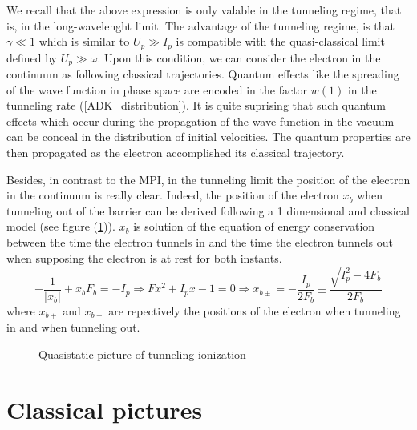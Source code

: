\documentclass[a4paper]{article}
\begin{document}
\par
We recall that the above expression is only valable in the tunneling regime, that is, in the long-wavelenght limit. The advantage of the tunneling regime, is that $\gamma \ll 1$ which is similar to $U_{p} \gg I_{p}$ is compatible with the quasi-classical limit defined by $U_{p} \gg \omega$. Upon this condition, we can consider the electron in the continuum as following classical trajectories. Quantum effects like the spreading of the wave function in phase space are encoded in the factor $w(1)$ in the tunneling rate (\ref{ADK_distribution}). It is quite suprising that such quantum effects which occur during the propagation of the wave function in the vacuum can be conceal in the distribution of initial velocities. The quantum properties are then propagated as the electron accomplished its classical trajectory. 
\par
Besides, in contrast to the MPI, in the tunneling limit the position of the electron in the continuum is really clear.
Indeed, the position of the electron $x_{b}$ when tunneling out of the barrier can be derived following a 1 dimensional and classical model (see figure (\ref{tunneling_ionization})). $x_{b}$ is solution of the equation of energy conservation between the time the electron tunnels in and the time the electron tunnels out when supposing the electron is at rest for both instants.
\begin{equation}
-\frac{1}{| x_{b} |}+x_{b}F_{b}=-I_{p} \Rightarrow Fx^{2}+I_{p}x-1=0 \Rightarrow x_{b\pm}=-\frac{I_{p}}{2F_{b}}\pm\frac{\sqrt{I_{p}^{2}-4F_{b}}}{2F_{b}}
\end{equation} 
where $x_{b+}$ and $x_{b-}$ are repectively the positions of the electron when tunneling in and when tunneling out.

\begin{figure}[h] 
\centering
 
 \caption{Quasistatic picture of tunneling ionization}
 \label{tunneling_ionization} 
\end{figure}

\section{Classical pictures}
\end{document}
